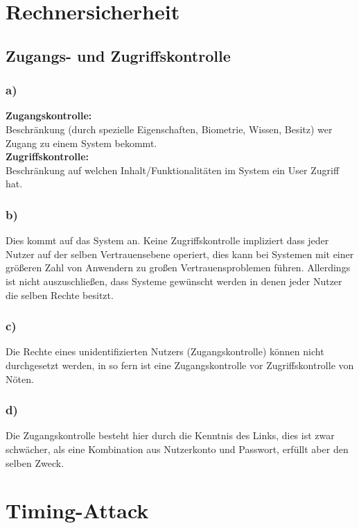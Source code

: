 \documentclass[a4paper,11pt]{scrartcl}
\title{\titleinfo}
\author{\authorinfo}
\begin{document}
\maketitle
\section{\textbf{Rechnersicherheit}}
\subsection{Zugangs- und Zugriffskontrolle}
\subsubsection*{a)} 
\textbf{Zugangskontrolle:} \\
Beschränkung (durch spezielle Eigenschaften, Biometrie, Wissen, Besitz) wer Zugang zu einem System
bekommt. \\
\textbf{Zugriffskontrolle:} \\
Beschränkung auf welchen Inhalt/Funktionalitäten im System ein User Zugriff hat.
\subsubsection*{b)} 
Dies kommt auf das System an. Keine Zugriffskontrolle impliziert dass jeder Nutzer auf der selben Vertrauensebene operiert, dies kann bei Systemen mit einer größeren Zahl von Anwendern zu großen Vertrauensproblemen führen. Allerdings ist nicht auszuschließen, dass Systeme gewünscht werden in denen jeder Nutzer die selben Rechte besitzt.
\subsubsection*{c)} 
Die Rechte eines unidentifizierten Nutzers (Zugangskontrolle) können nicht durchgesetzt werden, in so fern 
ist eine Zugangskontrolle vor Zugriffskontrolle von Nöten.
\subsubsection*{d)} 
Die Zugangskontrolle besteht hier durch die Kenntnis des Links, dies ist zwar schwächer, als eine Kombination aus Nutzerkonto und Passwort, erfüllt aber den selben Zweck. 


\section{\textbf{Timing-Attack}}
\end{document}
